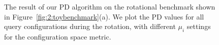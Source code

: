 \begin{figure}[!h]
\caption[Configuration space metric's influence on the result of our PD algorithm: rotational benchmark]{
The result of our PD algorithm on the rotational benchmark shown in Figure~\ref{fig:2:toybenchmark}(a). We plot the PD values for all query configurations during the rotation, with different $\mu_i$ settings for the configuration space metric.
}\label{fig:2:rotation_error}
\end{figure}


